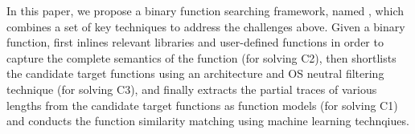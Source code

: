 
In this paper, we propose a binary function searching framework, named \tool, which combines a set of key techniques to address the challenges above. %
Given a binary function, \tool first inlines relevant libraries and user-defined functions
in order to capture the complete semantics of the function (for solving C2), then
shortlists the candidate target functions using an architecture and OS neutral filtering technique (for solving C3), and finally extracts the partial traces of various lengths from the candidate target functions as function models (for solving C1) and conducts the function similarity matching using machine learning technqiues.







